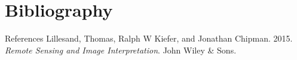 \documentclass[10pt,dvipsnames,ignorenonframetext,aspectratio=169]{beamer}
\newenvironment{CSLReferences}%
  {}%
  {\par}
\begin{document}
\hypertarget{bibliography}{%
\section{Bibliography}\label{bibliography}}

\begin{frame}{References}
\protect\hypertarget{references}{}
\hypertarget{refs}{}
\begin{CSLReferences}{1}{0}
\leavevmode{}%
Lillesand, Thomas, Ralph W Kiefer, and Jonathan Chipman. 2015.
\emph{Remote Sensing and Image Interpretation}. John Wiley \& Sons.

\end{CSLReferences}
\end{frame}
\end{document}
